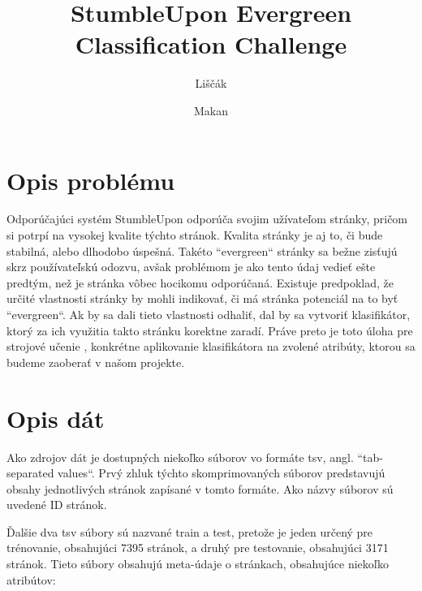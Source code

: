\documentclass{iitsrc}
\title{StumbleUpon Evergreen Classification Challenge}
\author{Liščák}{Tomáš}
\author{Makan}{Branislav}
\begin{document}
\maketitle

\begin{multicols}{2}
\raggedcolumns

\section{Opis problému}
Odporúčajúci systém StumbleUpon odporúča svojim užívateľom stránky, pričom si potrpí na vysokej kvalite týchto stránok. Kvalita stránky je aj to, či bude stabilná, alebo dlhodobo úspešná. Takéto ``evergreen`` stránky sa bežne zisťujú skrz používateľskú odozvu, avšak problémom je ako tento údaj vedieť ešte predtým, než je stránka vôbec hocikomu odporúčaná. Existuje predpoklad, že určité vlastnosti stránky by mohli indikovať, či má stránka potenciál na to byť ``evergreen``. Ak by sa dali tieto vlastnosti odhaliť, dal by sa vytvoriť klasifikátor, ktorý za ich využitia takto stránku korektne zaradí. Práve preto je toto úloha pre strojové učenie , konkrétne aplikovanie klasifikátora na zvolené atribúty, ktorou sa budeme zaoberať v našom projekte.

\section{Opis dát}
Ako zdrojov dát je dostupných niekoľko súborov vo formáte tsv, angl. ``tab-separated values``. Prvý zhluk týchto skomprimovaných súborov predstavujú obsahy jednotlivých stránok zapísané v tomto formáte. Ako názvy súborov sú uvedené ID stránok.

Ďalšie dva tsv súbory sú nazvané train a test, pretože je jeden určený pre trénovanie, obsahujúci 7395 stránok, a druhý pre testovanie, obsahujúci 3171 stránok. Tieto súbory obsahujú meta-údaje o stránkach, obsahujúce niekoľko atribútov:


\end{multicols}
\end{document}
